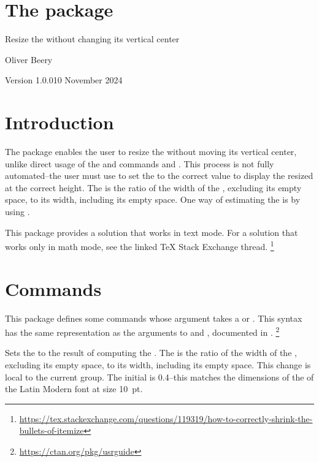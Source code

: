 \documentclass{beery}
\begin{document}
\section*
  {%
    The  package%
  }

Resize the  without changing its vertical center

Oliver Beery

Version 1.0.0\quad{}10 November 2024


\section{Introduction}
\label{sec:intro}

The  package enables the user to resize the  without moving its vertical center, unlike direct usage of the \LaTeXe{} and  commands  and .
This process is not fully automated\---the user must use  to set the \textbulletfactor{} to the correct value to display the resized  at the correct height.
The \textbulletfactor{} is the ratio of the width of the , excluding its empty space, to its width, including its empty space.
One way of estimating the \textbulletfactor{} is by using .

This package provides a solution that works in text mode.
For a solution that works only in math mode, see the linked \TeX{} Stack Exchange thread.%
\footnote{\url{https://tex.stackexchange.com/questions/119319/how-to-correctly-shrink-the-bullets-of-itemize}}


\section{Commands}
\label{sec:commands}

This package defines some commands whose argument takes a  or .
This syntax has the same representation as the arguments to  and , documented in .%
\footnote{\url{https://ctan.org/pkg/usrguide}}

 
\KeepNextPar*

Sets the \textbulletfactor{} to the result of computing the .
The \textbulletfactor{} is the ratio of the width of the , excluding its empty space, to its width, including its empty space.
This change is local to the current group.
The initial \textbulletfactor{} is \num{0.4}\---this matches the dimensions of the  of the Latin Modern font at size \qty{10}{pt}.
\end{document}
